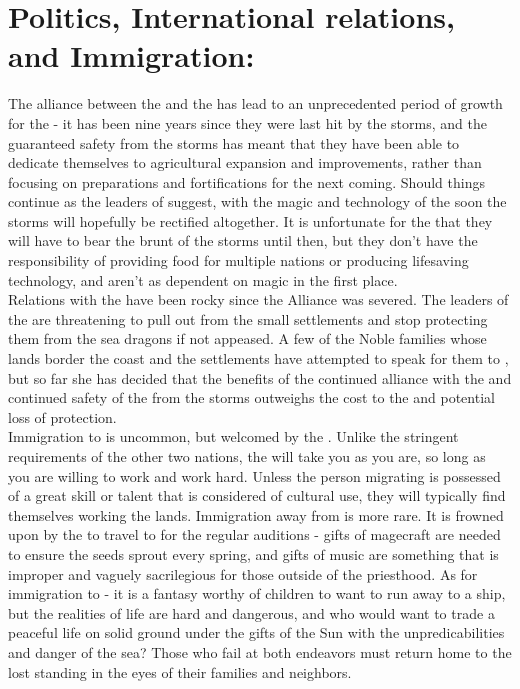 \documentclass[blue]{GL2020}
\begin{document}
\section{Politics, International relations, and Immigration:}

The alliance between the \pSun{} and the \pCreators{} has lead to an unprecedented period of growth for the \pSunCh{} - it has been nine years since they were last hit by the storms, and the guaranteed safety from the storms has meant that they have been able to dedicate themselves to agricultural expansion and improvements, rather than focusing on preparations and fortifications for the next coming.  Should things continue as the leaders of \pCreators{} suggest, with the magic and technology of the \pCreators{} soon the storms will hopefully be rectified altogether.  It is unfortunate for the \pVikings{} that they will have to bear the brunt of the storms until then, but they don't have the responsibility of providing food for multiple nations or producing lifesaving technology, and aren't as dependent on magic in the first place.\\

Relations with the \pViking{} have been rocky since the Alliance was severed.  The leaders of the \pVikings{} are threatening to pull out from the small settlements and stop protecting them from the sea dragons if not appeased.  A few of the Noble families whose lands border the coast and the \pVikings{} settlements have attempted to speak for them to \pQueen{}, but so far she has decided that the benefits of the continued alliance with the \pCreators{} and continued safety of the \pSunCh{} from the storms outweighs the cost to the \pVikings{} and potential loss of protection.\\

Immigration to \pSun{} is uncommon, but welcomed by the \pSunCh{}.  Unlike the stringent requirements of the other two nations, the \pSunCh{} will take you as you are, so long as you are willing to work and work hard.  Unless the person migrating is possessed of a great skill or talent that is considered of cultural use, they will typically find themselves working the lands.  Immigration away from \pSun{} is more rare.  It is frowned upon by the \pSunCh{} to travel to \pCreators{} for the regular auditions - gifts of magecraft are needed to ensure the seeds sprout every spring, and gifts of music are something that is improper and vaguely sacrilegious for those outside of the priesthood.  As for immigration to \pVikings{} - it is a fantasy worthy of children to want to run away to a \pVikings{} ship, but the realities of \pVikings{} life are hard and dangerous, and who would want to trade a peaceful life on solid ground under the gifts of the Sun with the unpredicabilities and danger of the sea?  Those who fail at both endeavors must return home to the lost standing in the eyes of their families and neighbors.\\
\end{document}
